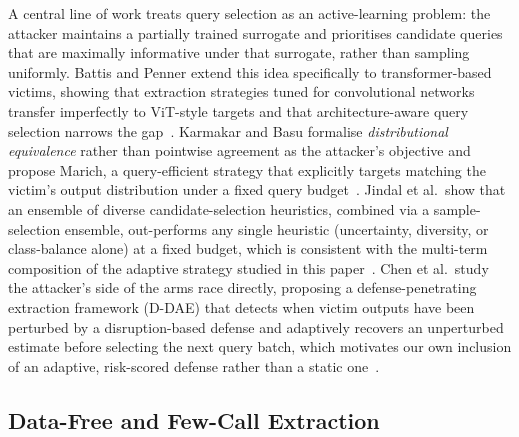 \documentclass[journal,10pt]{IEEEtran}
\begin{document}
A central line of work treats query selection as an active-learning problem: the attacker
maintains a partially trained surrogate and prioritises candidate queries that are maximally
informative under that surrogate, rather than sampling uniformly. Battis and Penner
extend this idea specifically to transformer-based victims, showing that extraction strategies
tuned for convolutional networks transfer imperfectly to ViT-style targets and that
architecture-aware query selection narrows the gap~\cite{battis2022vitextraction}. Karmakar and
Basu formalise \emph{distributional equivalence} rather than pointwise agreement as the attacker's
objective and propose Marich, a query-efficient strategy that explicitly targets matching the
victim's output distribution under a fixed query budget~\cite{karmakar2023marich}. Jindal et
al.\ show that an ensemble of diverse candidate-selection heuristics, combined via a
sample-selection ensemble, out-performs any single heuristic (uncertainty, diversity, or
class-balance alone) at a fixed budget, which is consistent with the multi-term composition of the
adaptive strategy studied in this paper~\cite{jindal2024armyofthieves}. Chen et al.\ study the
attacker's side of the arms race directly, proposing a defense-penetrating extraction framework
(D-DAE) that detects when victim outputs have been perturbed by a disruption-based defense and
adaptively recovers an unperturbed estimate before selecting the next query batch, which
motivates our own inclusion of an adaptive, risk-scored defense rather than a static
one~\cite{chen2023ddae}.

\subsection{Data-Free and Few-Call Extraction}
\end{document}
